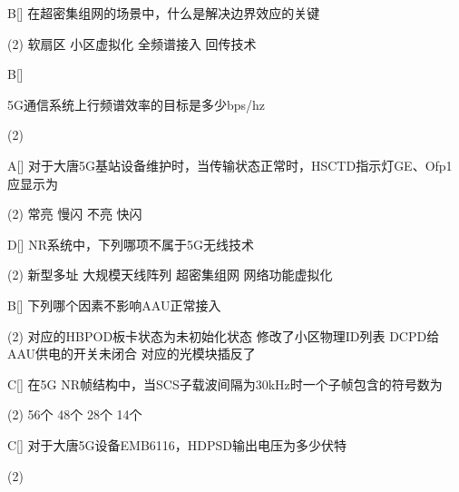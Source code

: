 \begin{choice}{B}[]
    在超密集组网的场景中，什么是解决边界效应的关键
    \begin{tasks}(2)
        \task 软扇区
        \task 小区虚拟化
        \task 全频谱接入
        \task 回传技术
    \end{tasks}
\end{choice}


\begin{choice}{B}[]

    5G通信系统上行频谱效率的目标是多少bps/hz
    \begin{tasks}(2)
    \end{tasks}
\end{choice}


\begin{choice}{A}[]
    对于大唐5G基站设备维护时，当传输状态正常时，HSCTD指示灯GE、Ofp1应显示为
    \begin{tasks}(2)
        \task 常亮
        \task 慢闪
        \task 不亮
        \task 快闪
    \end{tasks}
\end{choice}


\begin{choice}{D}[]
    NR系统中，下列哪项不属于5G无线技术
    \begin{tasks}(2)
        \task 新型多址
        \task 大规模天线阵列
        \task 超密集组网
        \task 网络功能虚拟化
    \end{tasks}
\end{choice}

\begin{choice}{B}[]
    下列哪个因素不影响AAU正常接入
    \begin{tasks}(2)
        \task 对应的HBPOD板卡状态为未初始化状态
        \task 修改了小区物理ID列表
        \task DCPD给AAU供电的开关未闭合
        \task 对应的光模块插反了
    \end{tasks}
\end{choice}

\begin{choice}{C}[]
    在5G NR帧结构中，当SCS子载波间隔为30kHz时一个子帧包含的符号数为
    \begin{tasks}(2)
        \task 56个
        \task 48个
        \task 28个
        \task 14个
    \end{tasks}
\end{choice}


\begin{choice}{C}[]
    对于大唐5G设备EMB6116，HDPSD输出电压为多少伏特

    \begin{tasks}(2)
    \end{tasks}
\end{choice}


